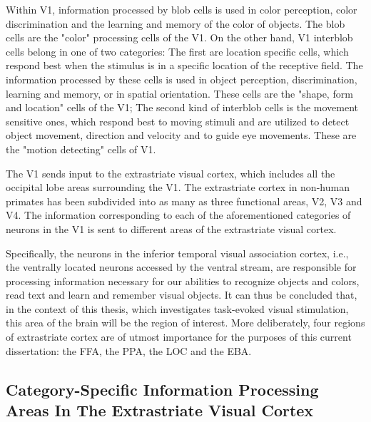 Within \gls{V1}, information processed by \gls{blob cells} is used in color perception, color discrimination and the learning and memory of the color of objects. The \gls{blob cells} are the "color" processing cells of the \gls{V1}. On the other hand, \gls{V1} \gls{interblob cells} belong in one of two categories: The first are location specific cells, which respond best when the stimulus is in a specific location of the receptive field. The information processed by these cells is used in object perception, discrimination, learning and memory, or in spatial orientation. These cells are the "shape, form and location" cells of the \gls{V1}; The second kind of \gls{interblob cells} is the movement sensitive ones, which respond best to moving stimuli and are utilized to detect object movement, direction and velocity and to guide eye movements. These are the "motion detecting" cells of \gls{V1}.

The \gls{V1} sends input to the extrastriate visual cortex, which includes all the occipital lobe areas surrounding the \gls{V1}. The extrastriate cortex in non-human primates has been subdivided into as many as three functional areas, \gls{V2}, \gls{V3} and \gls{V4}. The information corresponding to each of the aforementioned categories of neurons in the \gls{V1} is sent  to different areas of the extrastriate visual cortex.

Specifically, the neurons in the inferior temporal visual association cortex, i.e., the ventrally located neurons accessed by the ventral stream, are responsible for processing information necessary for our abilities to recognize objects and colors, read text and learn and remember visual objects. It can thus be concluded that, in the context of this thesis, which investigates task-evoked visual stimulation, this area of the brain will be the region of interest. More deliberately, four regions of extrastriate cortex are of utmost importance for the purposes of this current dissertation: the \gls{FFA}, the \gls{PPA}, the \gls{LOC} and the \gls{EBA}.

\subsection{Category-Specific Information Processing Areas In The Extrastriate Visual Cortex}

